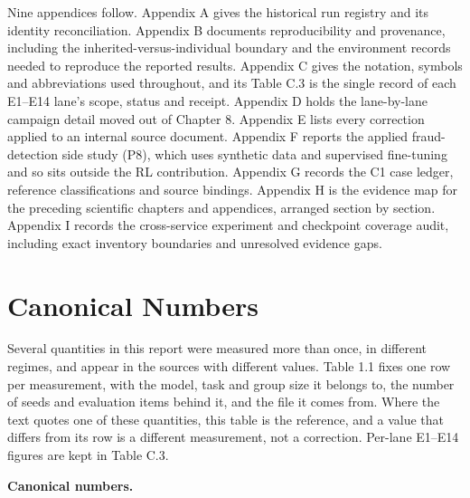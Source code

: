 \documentclass[12pt,a4paper]{report}
\begin{document}
Nine appendices follow. Appendix A gives the historical run registry and
its identity reconciliation. Appendix B documents reproducibility and
provenance, including the inherited-versus-individual boundary and the
environment records needed to reproduce the reported results. Appendix C
gives the notation, symbols and abbreviations used throughout, and its
Table C.3 is the single record of each E1--E14 lane's scope, status and
receipt. Appendix D holds the lane-by-lane campaign detail moved out of
Chapter 8. Appendix E lists every correction applied to an internal
source document. Appendix F reports the applied fraud-detection side
study (P8), which uses synthetic data and supervised fine-tuning and so
sits outside the RL contribution. Appendix G records the C1 case ledger,
reference classifications and source bindings. Appendix H is the
evidence map for the preceding scientific chapters and appendices,
arranged section by section. Appendix I records the cross-service
experiment and checkpoint coverage audit, including exact inventory
boundaries and unresolved evidence gaps.

\section{Canonical Numbers}\label{canonical-numbers}

Several quantities in this report were measured more than once, in
different regimes, and appear in the sources with different values.
Table 1.1 fixes one row per measurement, with the model, task and group
size it belongs to, the number of seeds and evaluation items behind it,
and the file it comes from. Where the text quotes one of these
quantities, this table is the reference, and a value that differs from
its row is a different measurement, not a correction. Per-lane E1--E14
figures are kept in Table C.3.

\textbf{Canonical numbers.}
\end{document}
